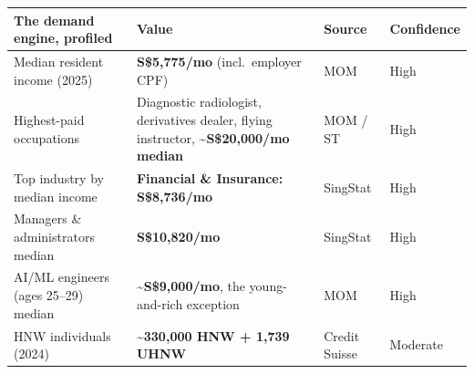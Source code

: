 \documentclass[10pt,twoside,openany]{memoir}
\renewcommand{\arraystretch}{1.1}
\begin{document}
{{{{{{{\def\LTcaptype{none} %
{\renewcommand{\arraystretch}{0.9}\begin{longtable}[]{@{}
  >{\raggedright\arraybackslash}p{}
  >{\raggedright\arraybackslash}p{}
  >{\raggedright\arraybackslash}p{}
  >{\raggedright\arraybackslash}p{}@{}}
\toprule\noalign{}
\begin{minipage}[b]{\linewidth}\raggedright
The demand engine, profiled
\end{minipage} & \begin{minipage}[b]{\linewidth}\raggedright
Value
\end{minipage} & \begin{minipage}[b]{\linewidth}\raggedright
Source
\end{minipage} & \begin{minipage}[b]{\linewidth}\raggedright
Confidence
\end{minipage} \\
\midrule\noalign{}
\endhead
\bottomrule\noalign{}
\endlastfoot
Median resident income (2025) & \textbf{S\$5,775/mo} (incl.~employer
CPF) & MOM & High \\
Highest-paid occupations & Diagnostic radiologist, derivatives dealer,
flying instructor, \textbf{\textasciitilde S\$20,000/mo median} & MOM /
ST & High \\
Top industry by median income & \textbf{Financial \& Insurance:
S\$8,736/mo} & SingStat & High \\
Managers \& administrators median & \textbf{S\$10,820/mo} & SingStat &
High \\
AI/ML engineers (ages 25--29) median &
\textbf{\textasciitilde S\$9,000/mo}, the young-and-rich exception & MOM
& High \\
HNW individuals (2024) & \textbf{\textasciitilde330,000 HNW + 1,739
UHNW} & Credit Suisse & Moderate \\
\end{longtable}
}

}}}}}}}
\end{document}

